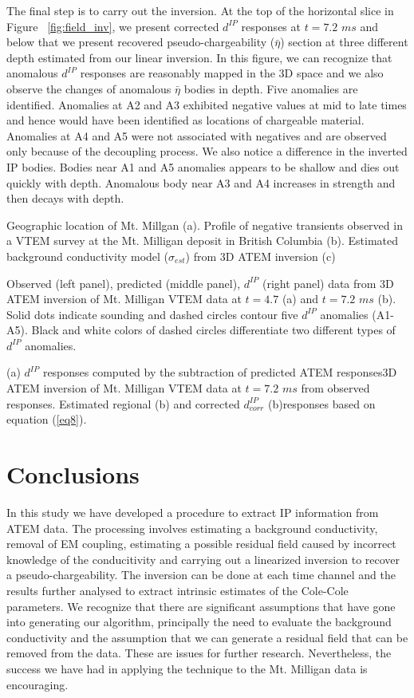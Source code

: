 \documentclass{segabs}
\begin{document}
The final step is to carry out the inversion. At the top of the horizontal slice in Figure ~\ref{fig:field_inv}, we present corrected $d^{IP}$ responses at  $t = 7.2$ $ms$ and below that we present recovered pseudo-chargeability ($\bar{\eta}$) section at three different depth estimated from our linear inversion. In this figure, we can recognize that anomalous $d^{IP}$ responses are reasonably mapped in the 3D space and we also observe the changes of anomalous $\bar{\eta}$ bodies in depth.
Five anomalies are identified. Anomalies at A2 and A3 exhibited negative values at mid to late times and hence would have been identified as locations of chargeable material. Anomalies at A4 and A5 were not associated with negatives and are observed only because of the decoupling process. We also notice a difference in the inverted IP bodies. Bodies near A1 and A5 anomalies appears to be shallow and dies out quickly with depth. Anomalous body near A3 and A4 increases in strength and then decays with depth.

{Geographic location of Mt. Millgan (a). Profile of negative transients observed in a VTEM survey at the Mt. Milligan deposit in British Columbia (b). Estimated background conductivity model ($\sigma_{est}$) from 3D ATEM inversion \cite[]{yang20143} (c)}

{Observed (left panel), predicted (middle panel), $d^{IP}$ (right panel) data from 3D ATEM inversion of Mt. Milligan VTEM data at $t=4.7$ (a) and $t=7.2$ $ms$ (b). Solid dots indicate sounding and dashed circles contour five $d^{IP}$ anomalies (A1-A5). Black and white colors of dashed circles differentiate two different types of $d^{IP}$ anomalies.}

{(a) $d^{IP}$ responses computed by the subtraction of predicted ATEM responses3D ATEM inversion of Mt. Milligan VTEM data at $t=7.2$ $ms$ from observed responses. Estimated regional (b) and corrected $d^{IP}_{corr}$ (b)responses based on equation (\ref{eq8}).}

\section{Conclusions}
In this study we have developed a procedure to extract IP information from ATEM data. The processing involves estimating a background conductivity, removal of EM coupling, estimating a possible residual field caused by incorrect knowledge of the conducitivity and carrying out a linearized inversion to recover a pseudo-chargeability. The inversion can be done at each time channel and the results further analysed to extract intrinsic estimates of the Cole-Cole parameters. We recognize that there are significant assumptions that have gone into generating our algorithm, principally the need to evaluate the background conductivity and the assumption that we can generate a residual field that can be removed from the data. These are issues for further research. Nevertheless, the success we have had in applying the technique to the Mt. Milligan data is encouraging.
\end{document}
